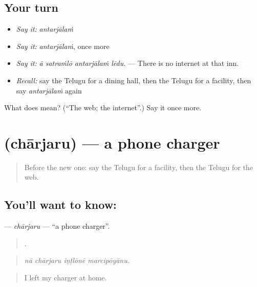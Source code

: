 \subsection*{Your turn}
\begin{itemize}
\raggedright
  \item \emph{Say it:} \emph{antarjālaṁ}
  \item \emph{Say it:} \emph{antarjālaṁ}, once more
  \item \emph{Say it:} \emph{ā satraṁlō antarjālaṁ lēdu.} — There is no internet at that inn.
  \item \emph{Recall:} say the Telugu for a dining hall, then the Telugu for a facility, then say \emph{antarjālaṁ} again
\end{itemize}

\begin{tcolorbox}[breakable,colback=teal!4,colframe=teal!35!black,title={Before you move on}]
What does  mean? (\textquotedblleft{}The web; the internet\textquotedblright{}.) Say it once more.
\end{tcolorbox}
\section[\texorpdfstring{\te{ఛార్జరు} (chārjaru)}{ఛార్జరు (chārjaru)}]{ (chārjaru) — a phone charger}

\label{lesson:TE-C459-charjaru}



\begin{quote}
Before the new one: say the Telugu for a facility, then the Telugu for the web.
\end{quote}

\subsection*{You'll want to know: }
\textbf{} — \emph{chārjaru} — \textquotedblleft{}a phone charger\textquotedblright{}.

\begin{quote}
   .
\end{quote}

\begin{quote}
\emph{nā chārjaru iṇṭlōnē marcipōyānu.}
\end{quote}

\begin{quote}
I left my charger at home.
\end{quote}


